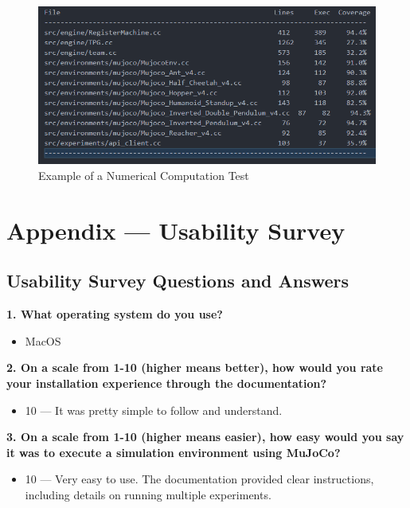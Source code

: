 \documentclass[12pt, titlepage]{article}
\begin{document}
\begin{figure}[h]
    \centering
    \includegraphics[width=1\textwidth]{img/code_coverage.png}
    \caption{Example of a Numerical Computation Test}
  \end{figure}
  


\newpage{}
\section{Appendix --- Usability Survey}

\subsection{Usability Survey Questions and Answers}

\textbf{1. What operating system do you use?}

\begin{itemize}
    \item MacOS
\end{itemize}

\vspace{1em}

\textbf{2. On a scale from 1-10 (higher means better), how would you rate your installation experience through the documentation?}

\begin{itemize}
    \item 10 --- It was pretty simple to follow and understand.
\end{itemize}

\vspace{1em}

\textbf{3. On a scale from 1-10 (higher means easier), how easy would you say it was to execute a simulation environment using MuJoCo?}

\begin{itemize}
    \item 10 --- Very easy to use. The documentation provided clear instructions,
          including details on running multiple experiments.
\end{itemize}
\end{document}
